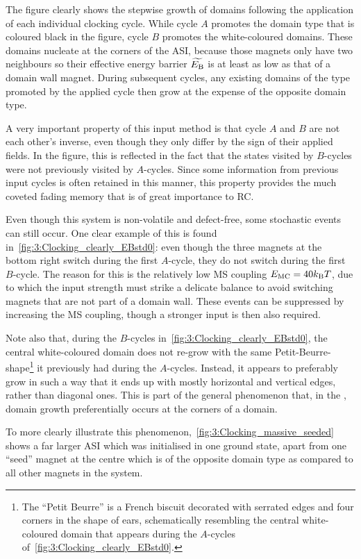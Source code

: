 The figure clearly shows the stepwise growth of domains following the application of each individual clocking cycle.
While cycle $A$ promotes the domain type that is coloured black in the figure, cycle $B$ promotes the white-coloured domains.
These domains nucleate at the corners of the ASI, because those magnets only have two neighbours so their effective energy barrier $\widetilde{E_\mathrm{B}}$ is at least as low as that of a domain wall magnet.
During subsequent cycles, any existing domains of the type promoted by the applied cycle then grow at the expense of the opposite domain type. \par
A very important property of this input method is that cycle $A$ and $B$ are not each other's inverse, even though they only differ by the sign of their applied fields.
In the figure, this is reflected in the fact that the states visited by $B$-cycles were not previously visited by $A$-cycles.
Since some information from previous input cycles is often retained in this manner, this property provides the much coveted fading memory that is of great importance to RC. \par
Even though this system is non-volatile and defect-free, some stochastic events can still occur.
One clear example of this is found in~\cref{fig:3:Clocking_clearly_EBstd0}: even though the three magnets at the bottom right switch during the first $A$-cycle, they do not switch during the first $B$-cycle.
The reason for this is the relatively low MS coupling $\EMC=40\kBT$, due to which the input strength must strike a delicate balance to avoid switching magnets that are not part of a domain wall.
These events can be suppressed by increasing the MS coupling, though a stronger input is then also required. \par %

Note also that, during the $B$-cycles in~\cref{fig:3:Clocking_clearly_EBstd0}, the central white-coloured domain does not re-grow with the same Petit-Beurre-shape\footnote{
	The ``Petit Beurre'' is a French biscuit decorated with serrated edges and four corners in the shape of ears, schematically resembling the central white-coloured domain that appears during the $A$-cycles of~\cref{fig:3:Clocking_clearly_EBstd0}.
} it previously had during the $A$-cycles.
Instead, it appears to preferably grow in such a way that it ends up with mostly horizontal and vertical edges, rather than diagonal ones.
This is part of the general phenomenon that, in the , domain growth preferentially occurs at the corners of a domain. \par
To more clearly illustrate this phenomenon,~\cref{fig:3:Clocking_massive_seeded} shows a far larger ASI which was initialised in one ground state, apart from one ``seed'' magnet at the centre which is of the opposite domain type as compared to all other magnets in the system.


